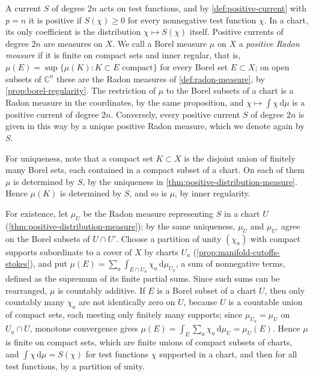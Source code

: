 A current $S$ of degree $2n$ acts on test functions, and by \cref{def:positive-current} with $p=n$ it is positive if $S(\chi)\geq0$ for every nonnegative test function $\chi$. In a chart, its only coefficient is the distribution $\chi\mapsto S(\chi)$ itself. Positive currents of degree $2n$ are measures on $X$. We call a Borel measure $\mu$ on $X$ a \emph{positive Radon measure} if it is finite on compact sets and inner regular, that is, $\mu(E)=\sup\{\mu(K):K\subset E\text{ compact}\}$ for every Borel set $E\subset X$; on open subsets of $\mathbb C^n$ these are the Radon measures of \cref{def:radon-measure}, by \cref{prop:borel-regularity}. The restriction of $\mu$ to the Borel subsets of a chart is a Radon measure in the coordinates, by the same proposition, and $\chi\mapsto\int\chi\,\mathrm d\mu$ is a positive current of degree $2n$. Conversely, every positive current $S$ of degree $2n$ is given in this way by a unique positive Radon measure, which we denote again by $S$.

For uniqueness, note that a compact set $K\subset X$ is the disjoint union of finitely many Borel sets, each contained in a compact subset of a chart. On each of them $\mu$ is determined by $S$, by the uniqueness in \cref{thm:positive-distribution-measure}. Hence $\mu(K)$ is determined by $S$, and so is $\mu$, by inner regularity.

For existence, let $\mu_U$ be the Radon measure representing $S$ in a chart $U$ (\cref{thm:positive-distribution-measure}); by the same uniqueness, $\mu_U$ and $\mu_{U'}$ agree on the Borel subsets of $U\cap U'$. Choose a partition of unity $(\chi_a)$ with compact supports subordinate to a cover of $X$ by charts $U_a$ (\cref{prop:manifold-cutoffs-stokes}), and put $\mu(E)=\sum_a\int_{E\cap U_a}\chi_a\,\mathrm d\mu_{U_a}$, a sum of nonnegative terms, defined as the supremum of its finite partial sums. Since such sums can be rearranged, $\mu$ is countably additive. If $E$ is a Borel subset of a chart $U$, then only countably many $\chi_a$ are not identically zero on $U$, because $U$ is a countable union of compact sets, each meeting only finitely many supports; since $\mu_{U_a}=\mu_U$ on $U_a\cap U$, monotone convergence gives $\mu(E)=\int_E\sum_a\chi_a\,\mathrm d\mu_U=\mu_U(E)$. Hence $\mu$ is finite on compact sets, which are finite unions of compact subsets of charts, and $\int\chi\,\mathrm d\mu=S(\chi)$ for test functions $\chi$ supported in a chart, and then for all test functions, by a partition of unity.

